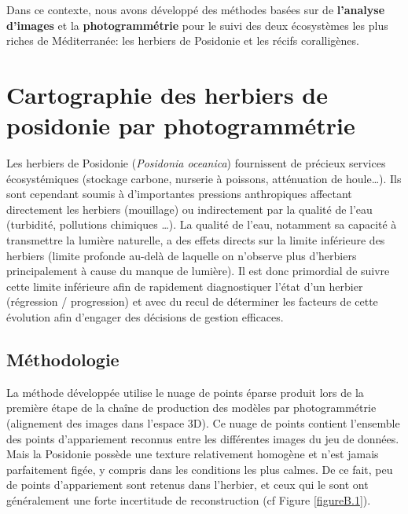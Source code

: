\medskip

\begin{tcolorbox}[colback=white,%
                  colframe=black,%
                  width=\linewidth,%
                  arc=3mm, auto outer arc,
                 ]
Dans ce contexte, nous avons développé des méthodes basées sur de \textbf{l’analyse d’images} et la \textbf{photogrammétrie} pour le suivi des deux écosystèmes les plus riches de Méditerranée: les herbiers de Posidonie et les récifs coralligènes.
\end{tcolorbox}


\section*{Cartographie des herbiers de posidonie par photogrammétrie}

Les herbiers de Posidonie (\textit{Posidonia oceanica}) fournissent de précieux services écosystémiques (stockage carbone, nurserie à poissons, atténuation de houle…). Ils sont cependant soumis à d’importantes pressions anthropiques affectant directement les herbiers (mouillage) ou indirectement par la qualité de l’eau (turbidité, pollutions chimiques …). La qualité de l’eau, notamment sa capacité à transmettre la lumière naturelle, a des effets directs sur la limite inférieure des herbiers (limite profonde au-delà de laquelle on n’observe plus d’herbiers principalement à cause du manque de lumière). Il est donc primordial de suivre cette limite inférieure afin de rapidement diagnostiquer l’état d’un herbier (régression / progression) et avec du recul de déterminer les facteurs de cette évolution afin d’engager des décisions de gestion efficaces.


\subsection*{Méthodologie}
La méthode développée utilise le nuage de points éparse produit lors de la première étape de la chaîne de production des modèles par photogrammétrie (alignement des images dans l’espace 3D). Ce nuage de points contient l’ensemble des points d’appariement reconnus entre les différentes images du jeu de données. Mais la Posidonie possède une texture relativement homogène et n’est jamais parfaitement figée, y compris dans les conditions les plus calmes. De ce fait, peu de points d’appariement sont retenus dans l’herbier, et ceux qui le sont ont généralement une forte incertitude de reconstruction (cf Figure \ref{figureB.1}).

